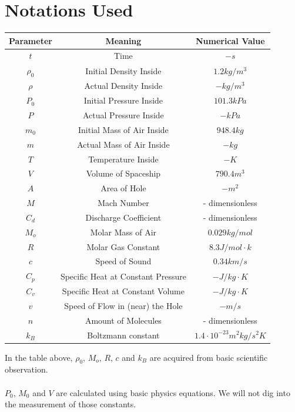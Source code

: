 \section{Notations Used}
\begin{table}[h!]
    \centering
    \begin{tabular}{|c|c|c|}
        \hline
        \textbf{Parameter} & \textbf{Meaning} & \textbf{Numerical Value} \\
        \hline
        $t$ & Time & $-s$ \\
        $\rho_0$ & Initial Density Inside& $1.2 kg/ m^3$\\
        $\rho$ & Actual Density Inside& $-kg/ m^3$  \\
        $P_0$ & Initial Pressure Inside& $101.3 kPa$\\
        $P$ & Actual Pressure Inside& $-kPa$ \\
        $m_0$ & Initial Mass of Air Inside& $948.4kg$ \\
        $m$ & Actual Mass of Air Inside& $-kg$ \\
        $T$ & Temperature Inside&$-K$\\
        $V$ & Volume of Spaceship& $790.4 m^3$ \\
        $A$ & Area of Hole & $-m^2$ \\
        $M$ & Mach Number& - dimensionless \\
        $C_d$ & Discharge Coefficient& - dimensionless \\
        $M_o$ & Molar Mass of Air& $0.029kg/mol$ \\
        $R$ & Molar Gas Constant & $8.3 J/mol\cdot k$ \\
        $c$ & Speed of Sound & $0.34 km/s$ \\
        $C_p$ & Specific Heat at Constant Pressure & $-J/kg\cdot K$ \\
        $C_v$ & Specific Heat at Constant Volume & $-J/kg\cdot K$ \\
        $v$ & Speed of Flow in (near) the Hole & $-m/s$ \\
        $n$ & Amount of Molecules & - dimensionless \\
        $k_B$ & Boltzmann constant & $1.4\cdot 10^{-23} m^2kg/s^2K$ \\
        
        \hline
    \end{tabular}
\end{table}

In the table above, $\rho_0$, $M_o$, $R$, $c$ and $k_B$ are acquired from basic scientific observation.
\\\\$P_0$, $M_0$ and $V$ are calculated using basic physics equations. We will not dig into the measurement of those constants.

